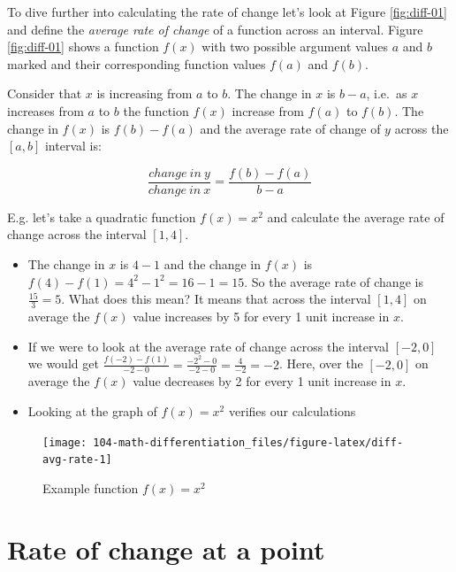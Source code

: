 \documentclass[
]{book}
\providecommand{\tightlist}{%
  \setlength{\itemsep}{0pt}\setlength{\parskip}{0pt}}
\theoremstyle{definition}
\theoremstyle{definition}
\theoremstyle{definition}
\theoremstyle{remark}
\begin{document}
To dive further into calculating the rate of change let's look at Figure \ref{fig:diff-01} and define the \emph{average rate of change} of a function across an interval. Figure \ref{fig:diff-01} shows a function \(f(x)\) with two possible argument values \(a\) and \(b\) marked and their corresponding function values \(f(a)\) and \(f(b)\).

Consider that \(x\) is increasing from \(a\) to \(b\). The change in \(x\) is \(b-a\), i.e.~as \(x\) increases from \(a\) to \(b\) the function \(f(x)\) increase from \(f(a)\) to \(f(b)\). The change in \(f(x)\) is \(f(b)-f(a)\) and the average rate of change of \(y\) across the \([a,b]\) interval is:

\begin{equation}
\frac{change\:in\:y}{change\:in\:x}=\frac{f(b)-f(a)}{b-a}
\label{eq:diff-point}
\end{equation}

E.g. let's take a quadratic function \(f(x)=x^2\) and calculate the average rate of change across the interval \([1, 4]\).

\begin{itemize}
\tightlist
\item
  The change in \(x\) is \(4-1\) and the change in \(f(x)\) is \(f(4) - f(1) = 4^2 -1^2 = 16 - 1 = 15\). So the average rate of change is \(\frac{15}{3}=5\). What does this mean? It means that across the interval \([1,4]\) on average the \(f(x)\) value increases by 5 for every 1 unit increase in \(x\).
\item
  If we were to look at the average rate of change across the interval \([-2, 0]\) we would get \(\frac{f(-2)-f(1)}{-2 - 0}=\frac{-2^2-0}{-2-0}=\frac{4}{-2} = -2\). Here, over the \([-2, 0]\) on average the \(f(x)\) value decreases by 2 for every 1 unit increase in \(x\).
\item
  Looking at the graph of \(f(x)=x^2\) verifies our calculations
\end{itemize}

\begin{figure}

{\centering \texttt{[image: 104-math-differentiation\_files/figure-latex/diff-avg-rate-1]} 

}

\caption{Example function $f(x) = x^2$}\label{fig:diff-avg-rate}
\end{figure}

\hypertarget{rate-of-change-at-a-point}{%
\section{Rate of change at a point}\label{rate-of-change-at-a-point}}
\end{document}
